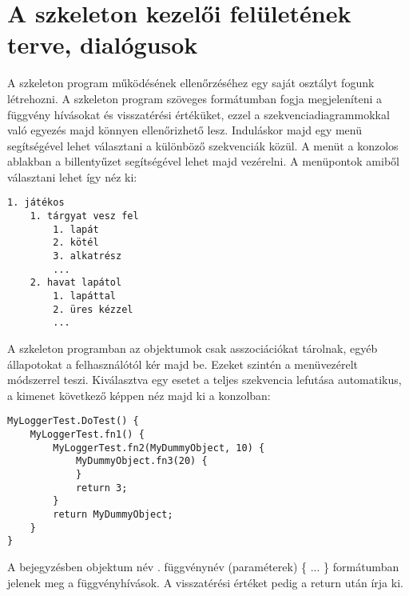 
\section{A szkeleton kezelői felületének terve, dialógusok}

A szkeleton program működésének ellenőrzéséhez egy saját osztályt fogunk létrehozni. A szkeleton program szöveges formátumban fogja megjeleníteni a függvény hívásokat és visszatérési értéküket, ezzel a szekvenciadiagrammokkal való egyezés majd könnyen ellenőrizhető lesz. Induláskor majd egy menü segítségével lehet választani a különböző szekvenciák közül. A menüt a konzolos ablakban a billentyűzet segítségével lehet majd vezérelni. A menüpontok amiből választani lehet így néz ki:
\begin{Verbatim}[samepage=true]
1. játékos
	1. tárgyat vesz fel
		1. lapát
		2. kötél
		3. alkatrész
		...
	2. havat lapátol
		1. lapáttal
		2. üres kézzel
		...
\end{Verbatim}
A szkeleton programban az objektumok csak asszociációkat tárolnak, egyéb állapotokat a felhasználótól kér majd be. Ezeket szintén a menüvezérelt módszerrel teszi. Kiválasztva egy esetet a teljes szekvencia lefutása automatikus, a kimenet következő képpen néz majd ki a konzolban:
\begin{Verbatim}[samepage=true]
MyLoggerTest.DoTest() {
	MyLoggerTest.fn1() {
		MyLoggerTest.fn2(MyDummyObject, 10) {
			MyDummyObject.fn3(20) {
			}
			return 3;
		}
		return MyDummyObject;
	}
}
\end{Verbatim}
A bejegyzésben objektum név . függvénynév (paraméterek) \{ ... \} formátumban jelenek meg a függvényhívások. A visszatérési értéket pedig a return után írja ki.


